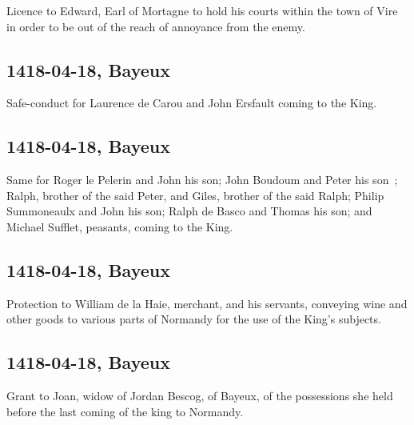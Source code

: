 \documentclass[a4paper,12pt,twoside]{book}
\begin{document}
                
                     Licence to Edward, Earl of Mortagne to hold his courts within the town of Vire in order to be out of the reach of annoyance from the enemy.
                  
                
                \subsection{1418-04-18, Bayeux}
                
                
                     Safe-conduct for Laurence de Carou and John Ersfault coming to the King.
                  
                
                \subsection{1418-04-18, Bayeux}
                
                
                     Same for Roger le Pelerin and John his son; John Boudoum and Peter his son ; Ralph, brother of the said Peter, and Giles, brother of the said Ralph; Philip Summoneaulx and John his son; Ralph de Basco and Thomas his son; and Michael Sufflet, peasants, coming to the King.
                  
                
                \subsection{1418-04-18, Bayeux}
                
                
                     Protection to William de la Haie, merchant, and his servants, conveying wine and other goods to various parts of Normandy for the use of the King's subjects.
                  
                
                \subsection{1418-04-18, Bayeux}
                
                
                     Grant to Joan, widow of Jordan Bescog, of Bayeux, of the possessions she held before the last coming of the king to Normandy.
                  
\end{document}
